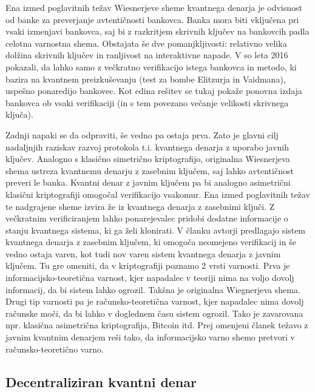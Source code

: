 \documentclass[12pt]{article}
\begin{document}
Ena izmed poglavitnih težav Wiesnerjeve sheme kvantnega denarja je odvisnost od banke za preverjanje avtentičnosti bankovca. Banka mora biti vključena pri vsaki izmenjavi bankovca, saj bi z razkritjem skrivnih ključev na bankovcih padla celotna varnostna shema. Obstajata še dve pomanjkljivosti: relativno velika dolžina skrivnih ključev in ranljivost na interaktivne napade. V \cite{brodutchAdaptiveAttackWiesner2016} so leta 2016 pokazali, da lahko samo z večkratno verifikacijo istega bankovca in metodo, ki bazira na kvantnem preizkuševanju (test za bombe Elitzurja in Vaidmana), uspešno ponaredijo bankovec. Kot edina rešitev se tukaj pokaže ponovna izdaja bankovca ob vsaki verifikaciji (in s tem povezano večanje velikosti skrivnega ključa).
\par Zadnji napaki se da odpraviti, še vedno pa ostaja prva. Zato je glavni cilj nadaljnjih raziskav razvoj protokola t.i. kvantnega denarja z uporabo javnih ključev. Analogno s klasično simetrično kriptografijo, originalna Wiesnerjeva shema ustreza kvantnemu denarju z zasebnim ključem, saj lahko avtentičnost preveri le banka. Kvantni denar z javnim ključem pa bi analogno asimetrični klasični kriptografiji omogočal verifikacijo vsakomur. Ena izmed poglavitnih težav te nadgrajene sheme izvira že iz kvantnega denarja z zasebnimi ključi. Z večkratnim verificiranjem lahko ponarejevalec pridobi dodatne informacije o stanju kvantnega sistema, ki ga želi klonirati. V članku \cite{aaronsonQuantumMoneyHidden2012} avtorji predlagajo sistem kvantnega denarja z zasebnim ključem, ki omogoča neomejeno verifikacij in še vedno ostaja varen, kot tudi nov varen sistem kvantnega denarja z javnim ključem. Tu gre omeniti, da v kriptografiji poznamo 2 vrsti varnosti. Prva je informacijsko-teoretična varnost, kjer napadalec v teoriji nima na voljo dovolj informacij, da bi sistem lahko ogrozil. Takšna je originalna Wiegnerjeva shema. Drugi tip varnosti pa je računsko-teoretična varnost, kjer napadalec nima dovolj računske moči, da bi lahko v doglednem času sistem ogrozil. Tako je zavarovana npr. klasična asimetrična kriptografija, Bitcoin itd. Prej omenjeni članek \cite{aaronsonQuantumMoneyHidden2012} težavo z javnim kvantnim denarjem reši tako, da informacijsko varno shemo pretvori v računsko-teoretično varno. 

\pagebreak

\subsection{Decentraliziran kvantni denar}
\end{document}
